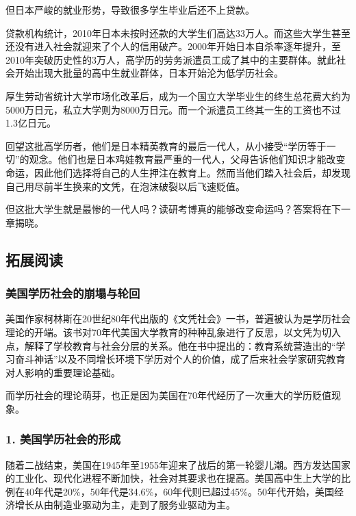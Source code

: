 但日本严峻的就业形势，导致很多学生毕业后还不上贷款。

贷款机构统计，2010年日本未按时还款的大学生们高达33万人。而这些大学生甚至还没有进入社会就迎来了个人的信用破产。2000年开始日本自杀率逐年提升，至2010年突破历史性的3万人，高学历的劳务派遣员工成了其中的主要群体。就此社会开始出现大批量的高中生就业群体，日本开始沦为低学历社会。

厚生劳动省统计大学市场化改革后，成为一个国立大学毕业生的终生总花费大约为5000万日元，私立大学则为8000万日元。而一个派遣员工终其一生的工资也不过1.3亿日元。

回望这批高学历者，他们是日本精英教育的最后一代人，从小接受“学历等于一切”的观念。他们也是日本鸡娃教育最严重的一代人，父母告诉他们知识才能改变命运，因此他们选择将自己的人生押注在教育上。然而当他们踏入社会后，却发现自己用尽前半生换来的文凭，在泡沫破裂以后飞速贬值。

但这批大学生就是最惨的一代人吗？读研考博真的能够改变命运吗？答案将在下一章揭晓。

\subsection{拓展阅读}

\subsubsection{美国学历社会的崩塌与轮回}

{\fangsong 美国作家柯林斯在20世纪80年代出版的《文凭社会》一书，普遍被认为是学历社会理论的开端。该书对70年代美国大学教育的种种乱象进行了反思，以文凭为切入点，解释了学校教育与社会分层的关系。他在书中提出的：教育系统营造出的“学习奋斗神话”以及不同增长环境下学历对个人的价值，成了后来社会学家研究教育对人影响的重要理论基础。\par}

{\fangsong 而学历社会的理论萌芽，也正是因为美国在70年代经历了一次重大的学历贬值现象。\par}

\subsubsection{1. 美国学历社会的形成}

{\fangsong 随着二战结束，美国在1945年至1955年迎来了战后的第一轮婴儿潮。西方发达国家的工业化、现代化进程不断加快，社会对其要求也在提高。美国高中生上大学的比例在40年代是20\%，50年代是34.6\%，60年代则已超过45\%。50年代开始，美国经济增长从由制造业驱动为主，走到了服务业驱动为主。\par}

